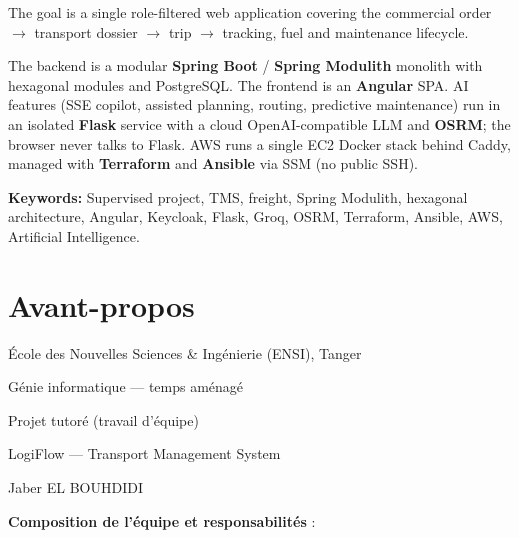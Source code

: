 The goal is a single role-filtered web application covering the commercial order $\rightarrow$ transport dossier $\rightarrow$ trip $\rightarrow$ tracking, fuel and maintenance lifecycle.

The backend is a modular \textbf{Spring Boot} / \textbf{Spring Modulith} monolith with hexagonal modules and PostgreSQL. The frontend is an \textbf{Angular} SPA. AI features (SSE copilot, assisted planning, routing, predictive maintenance) run in an isolated \textbf{Flask} service with a cloud OpenAI-compatible LLM and \textbf{OSRM}; the browser never talks to Flask. AWS runs a single EC2 Docker stack behind Caddy, managed with \textbf{Terraform} and \textbf{Ansible} via SSM (no public SSH).

\vspace{1em}
\noindent\textbf{Keywords:} Supervised project, TMS, freight, Spring Modulith, hexagonal architecture, Angular, Keycloak, Flask, Groq, OSRM, Terraform, Ansible, AWS, Artificial Intelligence.

\clearpage
\chapter*{Avant-propos}

\begin{description}[style=nextline,leftmargin=3.2cm,font=\normalfont\bfseries]
  \item[Établissement] École des Nouvelles Sciences \& Ingénierie (ENSI), Tanger
  \item[Filière] Génie informatique --- temps aménagé
  \item[Cadre] Projet tutoré (travail d'équipe)
  \item[Intitulé] LogiFlow --- Transport Management System
  \item[Encadrant] Jaber EL BOUHDIDI
\end{description}

\vspace{1.2em}
\noindent\textbf{Composition de l'équipe et responsabilités} :

